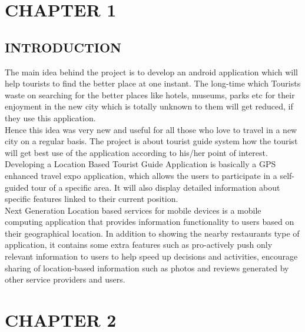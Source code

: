 \documentclass[12pt,a4paper]{article}
\begin{document}
	\tableofcontents
	\pagestyle{myPageStyle}
	\newpage

	
	
	
	\section*{CHAPTER 1}
	\subsection*{\protect \centering INTRODUCTION}
	\pagestyle{fancy}
	\pagestyle{myPageStyle}

	\hspace{0.5cm}The main idea behind the project is to develop an android application which will help tourists to find the better place at one instant. The long-time which Tourists waste on searching for the better places like hotels, museums, parks etc for their enjoyment in the new city which is totally
	unknown to them will get reduced, if they use this application.\\
	
	
	Hence this idea was very new and useful for all those who love to travel in a new city on a
	regular basis. The project is about tourist guide system how the tourist will get best use of the
	application according to his/her point of interest. Developing a Location Based Tourist Guide
	Application is basically a GPS enhanced travel expo application, which allows the users to
	participate in a self-guided tour of a specific area. It will also display detailed information about
	specific features linked to their current position.\\

	\hspace{0.5cm} Next Generation Location based services for mobile devices is a mobile computing application
	that provides information functionality to users based on their geographical location. In
	addition to showing the nearby restaurants type of application, it contains some extra features
	such as pro-actively push only relevant information to users to help speed up decisions and
	activities, encourage sharing of location-based information such as photos and reviews
	generated by other service providers and users.
	
	\newpage
	
	\section*{CHAPTER 2}
\end{document}
